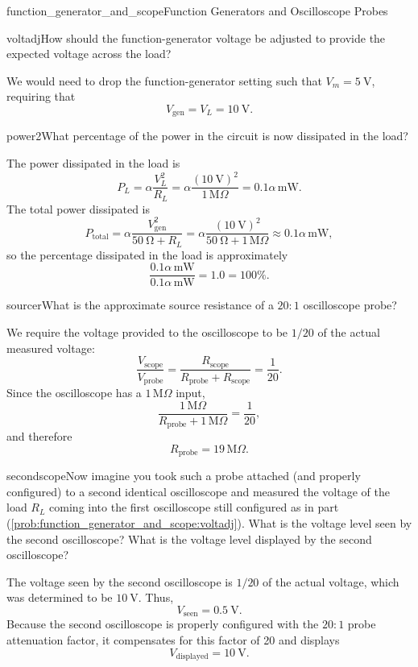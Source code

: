 \begin{mainquestion}{function_generator_and_scope}{Function Generators and Oscilloscope Probes}
\begin{partquestion}{voltadj}{How should the function-generator voltage be adjusted to provide the expected voltage across the load?}
\begin{answer}
We would need to drop the function-generator setting such that $V_m = \qty{5}{\volt}$, requiring that
\[
V_{\mathrm{gen}}=V_L=\qty{10}{\volt}.
\]
\end{answer}
\end{partquestion}
\begin{partquestion}{power2}{What percentage of the power in the circuit is now dissipated in the load?}
\begin{answer}
The power dissipated in the load is
\[
P_L=\alpha\frac{V_L^2}{R_L}
=\alpha\frac{(\qty{10}{\volt})^2}{1\,\mathrm{M}\Omega}
=0.1\alpha\,\mathrm{mW}.
\]
The total power dissipated is
\[
P_{\mathrm{total}}
=\alpha\frac{V_{\mathrm{gen}}^2}{\qty{50}{\ohm}+R_L}
=\alpha\frac{(\qty{10}{\volt})^2}{\qty{50}{\ohm}+1\,\mathrm{M}\Omega}
\approx 0.1\alpha\,\mathrm{mW},
\]
so the percentage dissipated in the load is approximately
\[
\frac{0.1\alpha\,\mathrm{mW}}{0.1\alpha\,\mathrm{mW}}
=1.0=100\%.
\]
\end{answer}
\end{partquestion}
\begin{partquestion}{sourcer}{What is the approximate source resistance of a $20{:}1$
oscilloscope probe?}
\begin{answer}
We require the voltage provided to the oscilloscope to be $1/20$ of the actual measured
voltage:
\[
\frac{V_{\mathrm{scope}}}{V_{\mathrm{probe}}}
=\frac{R_{\mathrm{scope}}}{R_{\mathrm{probe}}+R_{\mathrm{scope}}}
=\frac{1}{20}.
\]
Since the oscilloscope has a $1\,\mathrm{M}\Omega$ input,
\[
\frac{1\,\mathrm{M}\Omega}{R_{\mathrm{probe}}+1\,\mathrm{M}\Omega}
=\frac{1}{20},
\]
and therefore
\[
R_{\mathrm{probe}}=19\,\mathrm{M}\Omega.
\]
\end{answer}
\end{partquestion}
\begin{partquestion}{secondscope}{Now imagine you took such a probe attached (and properly configured)
to a second identical oscilloscope and measured the voltage of the load $R_L$ coming into
the first oscilloscope still configured as in part (\cref{prob:function_generator_and_scope:voltadj}). What is the voltage level seen by
the second oscilloscope? What is the voltage level displayed by the second oscilloscope?}
\begin{answer}
The voltage seen by the second oscilloscope is $1/20$ of the actual voltage, which was
determined to be $\qty{10}{\volt}$. Thus,
\[
V_{\mathrm{seen}}=\qty{0.5}{\volt}.
\]
Because the second oscilloscope is properly configured with the $20{:}1$ probe attenuation
factor, it compensates for this factor of 20 and displays
\[
V_{\mathrm{displayed}}=\qty{10}{\volt}.
\]
\end{answer}
\end{partquestion}

\end{mainquestion}


